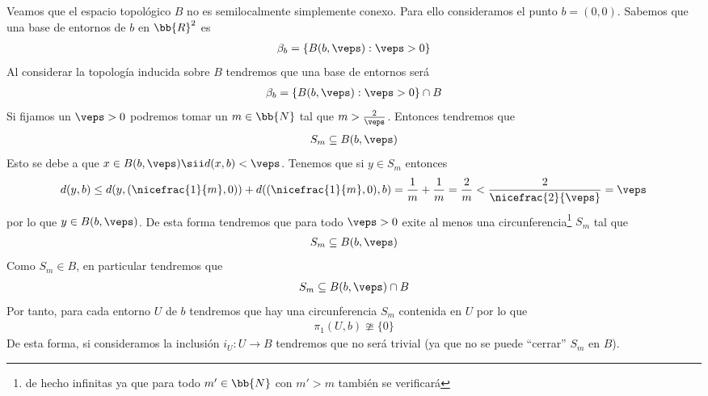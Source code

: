 \begin{ejemplo}
\begin{enumerate}
        Veamos que el espacio topológico $B$ no es semilocalmente simplemente conexo. Para ello consideramos el punto $b=(0,0)$. Sabemos que una base de entornos de $b$ en $\bb{R}^2$ es 
        \begin{gather*}
            \beta_b = \{B(b,\veps) : \veps > 0\}
        \end{gather*}
        Al considerar la topología inducida sobre $B$ tendremos que una base de entornos será 
        \begin{gather*}
            \beta_b = \{B(b,\veps) : \veps > 0\}\cap B
        \end{gather*}
        Si fijamos un $\veps > 0$ podremos tomar un $m\in \bb{N}$ tal que $m>\frac{2}{\veps}$. Entonces tendremos que 
        \begin{gather*}
            S_m \subseteq B(b,\veps)
        \end{gather*}
        Esto se debe a que $x\in B(b,\veps) \sii d(x,b) < \veps$. Tenemos que si $y\in S_m$ entonces
        \begin{gather*}
            d(y,b) \leq d(y, (\nicefrac{1}{m}, 0)) + d((\nicefrac{1}{m}, 0), b) = \frac{1}{m} + \frac{1}{m} = \frac{2}{m} < \frac{2}{\nicefrac{2}{\veps}} = \veps
        \end{gather*}
        por lo que $y\in B(b,\veps)$. De esta forma tendremos que para todo $\veps>0$ exite al menos una circunferencia\footnote{de hecho infinitas ya que para todo $m'\in \bb{N}$ con $m'>m$ también se verificará} $S_m$ tal que 
        \begin{gather*}
            S_m \subseteq B(b,\veps)
        \end{gather*}
        Como $S_m\in B$, en particular tendremos que 
        \begin{gather*}
            S_m \subseteq B(b,\veps) \cap B
        \end{gather*}
        Por tanto, para cada entorno $U$ de $b$ tendremos que hay una circunferencia $S_m$ contenida en $U$ por lo que
        \begin{gather*}
            \pi_1(U,b) \ncong \{0\}
        \end{gather*}
        De esta forma, si consideramos la inclusión $i_U:U \to B$ tendremos que no será trivial (ya que no se puede ``cerrar'' $S_m$ en $B$).


\end{enumerate}
\end{ejemplo}
